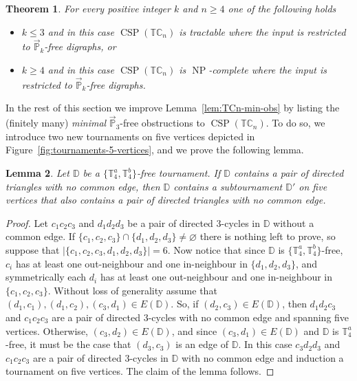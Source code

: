 \documentclass{article}
\newtheorem{theorem}{Theorem}
\newtheorem{lemma}[theorem]{Lemma}
\theoremstyle{definition}
\theoremstyle{remark}
\DeclareMathOperator{\NP}{NP}
\DeclareMathOperator{\CSP}{CSP}
\newcommand{\bC}{{\mathbb C}}
\newcommand{\bD}{{\mathbb D}}
\newcommand{\bP}{{\mathbb P}}
\newcommand{\bT}{{\mathbb T}}
\begin{document}
\begin{theorem}\label{thm:TC-Pk-free-classification}
    For every positive integer $k$ and $n\ge 4$ one of the following holds
    \begin{itemize}
        \item $k \le 3$ and in this case $\CSP(\bT\bC_n)$ is tractable
        where the input is restricted to $\vec{\bP}_k$-free digraphs, or
        \item $k \ge 4$ and in this case $\CSP(\bT\bC_n)$ is  $\NP$-complete
        where the input is restricted to $\vec{\bP}_k$-free digraphs.
    \end{itemize}
\end{theorem}

In the rest of this section we improve Lemma~\ref{lem:TCn-min-obs} by listing the (finitely many)
\emph{minimal} $\vec{\bP}_3$-free obstructions to $\CSP(\bT\bC_n)$. To do so, we introduce two
new tournaments on five vertices depicted in Figure~\ref{fig:tournaments-5-vertices}, and
we prove the following lemma.

\begin{lemma}\label{lem:2-triangles}
    Let $\bD$ be a $\{\bT_4^a, \bT_4^b\}$-free tournament. If $\bD$ contains a pair of directed triangles
    with no common edge, then $\bD$ contains a subtournament $\bD'$ on five vertices that
    also contains a pair of directed triangles with no common edge. 
\end{lemma}
\begin{proof}
    Let $c_1c_2c_3$ and $d_1d_2d_3$ be a pair of directed $3$-cycles in $\bD$ without a common
    edge. If $\{c_1,c_2,c_3\}\cap \{d_1,d_2,d_3\}\neq \varnothing$ there is nothing left to prove,
    so suppose that $|\{c_1,c_2,c_3,d_1,d_2,d_3\}| = 6$. Now notice that since $\bD$ is $\{\bT_4^a,\bT_4^b\}$-free,
    $c_i$ has at least one out-neighbour and one in-neighbour in $\{d_1,d_2,d_3\}$, and symmetrically
    each $d_i$ has at least one out-neighbour and one in-neighbour in $\{c_1,c_2,c_3\}$. Without loss
    of generality assume that $(d_1,c_1),(d_1,c_2),(c_3,d_1)\in E(\bD)$. So, if $(d_2,c_3)\in E(\bD)$,
    then $d_1d_2c_3$ and $c_1c_2c_3$ are a pair of directed $3$-cycles with no common edge and spanning 
    five vertices. Otherwise, $(c_3,d_2)\in E(\bD)$, and since $(c_3,d_1)\in E(\bD)$ and $\bD$
    is $\bT_4^a$-free, it must be the case that $(d_3,c_3)$ is an edge of $\bD$. In this case
    $c_3d_2d_3$ and $c_1c_2c_3$ are a pair of directed $3$-cycles in $\bD$ with no common edge
    and induction a tournament on five vertices. The claim of the lemma follows. 
\end{proof}
\end{document}

